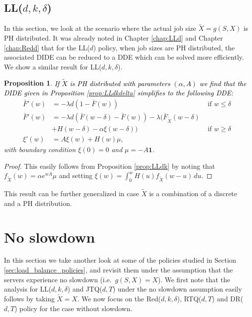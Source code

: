 \documentclass[12pt]{report}
\newtheorem{proposition}[theorem]{Proposition}
\begin{document}
\subsection{LL($d,k,\delta$)}
In this section, we look at the scenario where the actual job size $\tilde{X} = g(S,X)$ is PH distributed.
It was already noted in Chapter \ref{chap:LLd} and Chapter \ref{chap:Redd} that for the LL($d$) policy, when job sizes are PH distributed, the associated DIDE can be reduced to a DDE which can be solved more efficiently. We show a similar result for LL($d,k,\delta$).
\begin{proposition}\label{prop:PH_LLdk}
\textcolor{black}{If $\tilde{X}$ is PH distributed with parameters $(\alpha, A)$ we find that the DIDE given in Proposition \ref{prop:LLdkdelta} simplifies to the following DDE:}
\begin{align*}
\bar F'(w)&= -\lambda d (1-\bar F(w)) & \mbox{ if } w\leq \delta\\
\bar F'(w)&=-\lambda d (\bar F(w-\delta) - \bar F(w)) -\lambda \bigg( \bar F_{\tilde{X}}(w-\delta)\\
& + H(w-\delta) - \alpha \xi(w-\delta) \bigg)
&\mbox{ if } w \geq \delta\\
\xi'(w) &= A \xi(w) + H(w) \mu,
\end{align*}
with boundary condition $\xi(0)=0$ and $\mu=-A \textbf{1}$.
\end{proposition}
\begin{proof}
This easily follows from Proposition \ref{prop:LLdk} by noting that $f_{\tilde{X}}(w)=\alpha e^{wA} \mu$ and setting $\xi(w)=\int_0^{w} H(u) f_{\tilde{X}}(w-u)\, du$.
\end{proof}
This result can be further generalized in  case  $\tilde X$ is a combination of a discrete and a PH distribution.

%
%
%
%
\section{No slowdown} \label{sec:no_slowdown}
In this section we take another look at some of the policies studied in Section \ref{sec:load_balance_policies}, and revisit them under the assumption that the servers experience no slowdown (i.e.~$g(S,X)=X$). We first note that the analysis for LL($d,k,\delta$) and JTQ($d,T$) under the no slowdown assumption easily follows by taking $\tilde{X} = X$. We now focus on the Red($d,k,\delta$), RTQ($d, T$) and DR($d,T$) policy for the case without slowdown.
\end{document}
